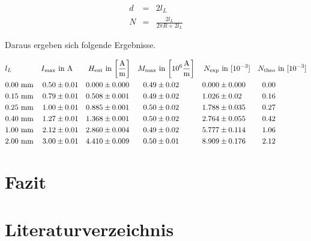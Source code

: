\documentclass[12pt,a4paper]{scrartcl}
\numberwithin{equation}{section} %
\renewcommand{\[}{} %
\renewcommand{\]}{\noindent} %
\begin{document}
\[
\begin{eqnarray}
    d &=& 2l_L \\
    N &=& \frac{2l_L}{2\pi R + 2l_L} 
\end{eqnarray}
\]

Daraus ergeben sich folgende Ergebnisse.

\[
\begin{align*}
    &l_L &
        I_\mathrm{max} &\text{ in } \mathrm A &
        H_\mathrm{ent} &\text{ in }
            {\tiny \left[ \frac{\mathrm A}{\mathrm m} \right] } &
        M_\mathrm{max} &\text{ in }
            {\tiny \left[ 10^6 \frac{\mathrm A}{\mathrm m} \right] } &
        N_\mathrm{exp} &\text{ in } [10^{-3}] &
        N_\mathrm{theo} &\text{ in } [10^{-3}]
        \\
    &0.00 \ \mathrm{mm} &
        0.50 &\pm 0.01 &
        0.000 &\pm 0.000 &
        0.49 &\pm 0.02 &
        0.000 &\pm 0.000 &
        0.00\\
    &0.15 \ \mathrm{mm} &
        0.79 &\pm 0.01 &
        0.508 &\pm 0.001 &
        0.49 &\pm 0.02 &
        1.026 &\pm 0.02 &
        0.16\\
    &0.25 \ \mathrm{mm} &
        1.00 &\pm 0.01 &
        0.885 &\pm 0.001 &
        0.50 &\pm 0.02 &
        1.788 &\pm 0.035 &
        0.27\\
    &0.40 \ \mathrm{mm} &
        1.27 &\pm 0.01 &
        1.368 &\pm 0.001 &
        0.50 &\pm 0.02 &
        2.764 &\pm 0.055 &
        0.42\\
    &1.00 \ \mathrm{mm} &
        2.12 &\pm 0.01 &
        2.860 &\pm 0.004 &
        0.49 &\pm 0.02 &
        5.777 &\pm 0.114 &
        1.06\\
    &2.00 \ \mathrm{mm} &
        3.00 &\pm 0.01 &
        4.410 &\pm 0.009 &
        0.50 &\pm 0.01 &
        8.909 &\pm 0.176 &
        2.12
\end{align*}
\]

\hypertarget{fazit}{%
\section{Fazit}\label{fazit}}

\hypertarget{literaturverzeichnis}{%
\section{Literaturverzeichnis}\label{literaturverzeichnis}}
\end{document}
